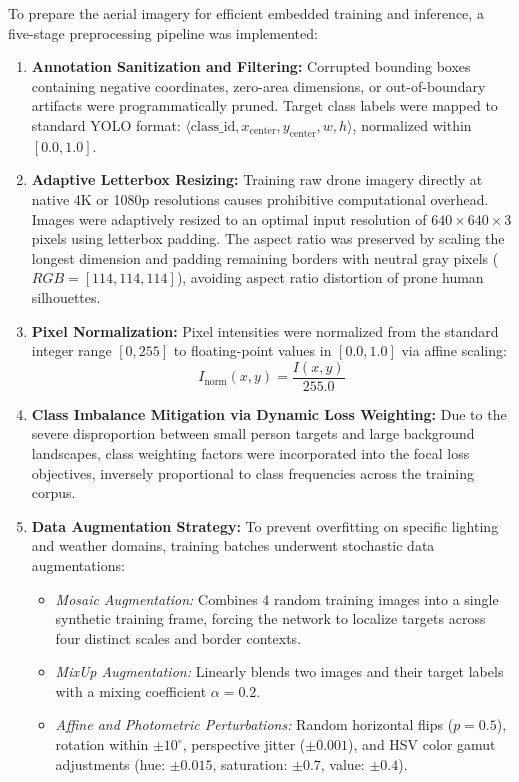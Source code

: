 To prepare the aerial imagery for efficient embedded training and inference, a five-stage preprocessing pipeline was implemented:
\begin{enumerate}
    \item \textbf{Annotation Sanitization and Filtering:} Corrupted bounding boxes containing negative coordinates, zero-area dimensions, or out-of-boundary artifacts were programmatically pruned. Target class labels were mapped to standard YOLO format: $\langle\text{class\_id}, x_{\text{center}}, y_{\text{center}}, w, h\rangle$, normalized within $[0.0, 1.0]$.
    \item \textbf{Adaptive Letterbox Resizing:} Training raw drone imagery directly at native 4K or 1080p resolutions causes prohibitive computational overhead. Images were adaptively resized to an optimal input resolution of $640 \times 640 \times 3$ pixels using letterbox padding. The aspect ratio was preserved by scaling the longest dimension and padding remaining borders with neutral gray pixels ($RGB = [114, 114, 114]$), avoiding aspect ratio distortion of prone human silhouettes.
    \item \textbf{Pixel Normalization:} Pixel intensities were normalized from the standard integer range $[0, 255]$ to floating-point values in $[0.0, 1.0]$ via affine scaling:
    \begin{equation}
        I_{\text{norm}}(x, y) = \frac{I(x, y)}{255.0}
    \end{equation}
    \item \textbf{Class Imbalance Mitigation via Dynamic Loss Weighting:} Due to the severe disproportion between small person targets and large background landscapes, class weighting factors were incorporated into the focal loss objectives, inversely proportional to class frequencies across the training corpus.
    \item \textbf{Data Augmentation Strategy:} To prevent overfitting on specific lighting and weather domains, training batches underwent stochastic data augmentations:
    \begin{itemize}
        \item \textit{Mosaic Augmentation:} Combines 4 random training images into a single synthetic training frame, forcing the network to localize targets across four distinct scales and border contexts.
        \item \textit{MixUp Augmentation:} Linearly blends two images and their target labels with a mixing coefficient $\alpha = 0.2$.
        \item \textit{Affine and Photometric Perturbations:} Random horizontal flips ($p=0.5$), rotation within $\pm 10^\circ$, perspective jitter ($\pm 0.001$), and HSV color gamut adjustments (hue: $\pm 0.015$, saturation: $\pm 0.7$, value: $\pm 0.4$).
    \end{itemize}
\end{enumerate}

